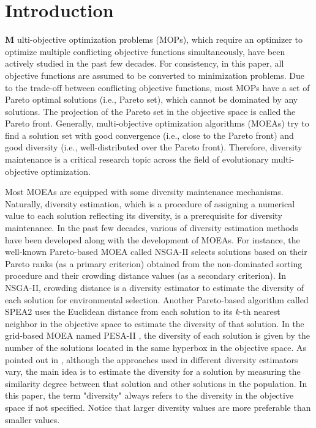 \section{Introduction}
\label{sec: Introduction}
\lettrine[findent=2pt]{\textbf{M}}{ }ulti-objective optimization problems (MOPs), which require an optimizer to optimize multiple conflicting objective functions simultaneously, have been actively studied in the past few decades. For consistency, in this paper, all objective functions are assumed to be converted to minimization problems. Due to the trade-off between conflicting objective functions, most MOPs have a set of Pareto optimal solutions (i.e., Pareto set), which cannot be dominated by any solutions. The projection of the Pareto set in the objective space is called the Pareto front. Generally, multi-objective optimization algorithms (MOEAs) try to find a solution set with good convergence (i.e., close to the Pareto front) and good diversity (i.e., well-distributed over the Pareto front). Therefore, diversity maintenance is a critical research topic across the field of evolutionary multi-objective optimization.

Most MOEAs are equipped with some diversity maintenance mechanisms. Naturally, diversity estimation, which is a procedure of assigning a numerical value to each solution reflecting its diversity, is a prerequisite for diversity maintenance. In the past few decades, various of diversity estimation methods have been developed along with the development of MOEAs. For instance, the well-known Pareto-based MOEA called NSGA-II \cite{NSGAII} selects solutions based on their Pareto ranks (as a primary criterion) obtained from the non-dominated sorting procedure and their crowding distance values (as a secondary criterion). In NSGA-II, crowding distance is a diversity estimator to estimate the diversity of each solution for environmental selection. Another Pareto-based algorithm called SPEA2 \cite{SPEA2} uses the Euclidean distance from each solution to its $k$-th nearest neighbor in the objective space to estimate the diversity of that solution. In the grid-based MOEA named PESA-II \cite{PESAII}, the diversity of each solution is given by the number of the solutions located in the same hyperbox in the objective space. As pointed out in \cite{SDE}, although the approaches used in different diversity estimators vary, the main idea is to estimate the diversity for a solution by measuring the similarity degree between that solution and other solutions in the population. In this paper, the term "diversity" always refers to the diversity in the objective space if not specified. Notice that larger diversity values are more preferable than smaller values.

